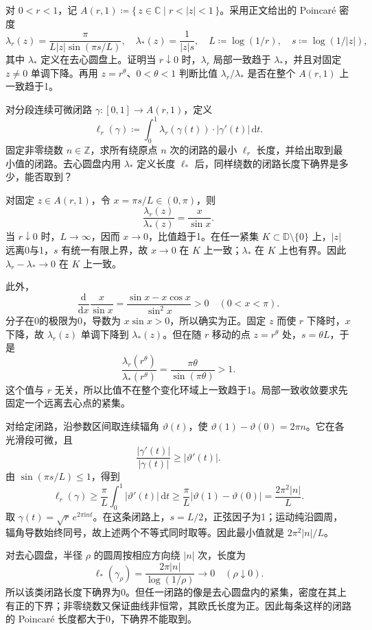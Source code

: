\begin{exercise}[环域退化与闭路长度]\label{b3:ex:12-7}
对 \(0<r<1\)，记 \(A(r,1)\coloneqq\{\,z\in\mathbb C\mid r<|z|<1\,\}\)。采用正文给出的 Poincaré 密度
\[
 \lambda_r(z)=\frac{\pi}{L|z|\sin(\pi s/L)},\quad
 \lambda_*(z)=\frac1{|z|s},\quad
 L\coloneqq\log(1/r),\quad s\coloneqq\log(1/|z|),
\]
其中 \(\lambda_*\) 定义在去心圆盘上。证明当 \(r\downarrow0\) 时，\(\lambda_r\) 局部一致趋于 \(\lambda_*\)，并且对固定 \(z\ne0\) 单调下降。再用 \(z=r^\theta\)、\(0<\theta<1\) 判断比值 \(\lambda_r/\lambda_*\) 是否在整个 \(A(r,1)\) 上一致趋于1。

\ProseParagraphBreak
对分段连续可微闭路 \(\gamma:[0,1]\rightarrow A(r,1)\)，定义
\[
 \ell_r(\gamma)\coloneqq\int_0^1\lambda_r(\gamma(t))\cdot|\gamma'(t)|\,\mathrm dt.
\]
固定非零绕数 \(n\in\mathbb Z\)，求所有绕原点 \(n\) 次的闭路的最小 \(\ell_r\) 长度，并给出取到最小值的闭路。去心圆盘内用 \(\lambda_*\) 定义长度 \(\ell_*\) 后，同样绕数的闭路长度下确界是多少，能否取到？
\end{exercise}
\begin{solution}
对固定 \(z\in A(r,1)\)，令 \(x=\pi s/L\in(0,\pi)\)，则
\[
 \frac{\lambda_r(z)}{\lambda_*(z)}=\frac{x}{\sin x}.
\]
当 \(r\downarrow0\) 时，\(L\rightarrow\infty\)，因而 \(x\rightarrow0\)，比值趋于1。在任一紧集 \(K\subset\mathbb D\setminus\{0\}\) 上，\(|z|\) 远离0与1，\(s\) 有统一有限上界，故 \(x\rightarrow0\) 在 \(K\) 上一致；\(\lambda_*\) 在 \(K\) 上也有界。因此 \(\lambda_r-\lambda_*\rightarrow0\) 在 \(K\) 上一致。

此外，
\[
 \frac{\mathrm d}{\mathrm dx}\frac{x}{\sin x}
 =\frac{\sin x-x\cos x}{\sin^2x}>0\quad(0<x<\pi).
\]
分子在0的极限为0，导数为 \(x\sin x>0\)，所以确实为正。固定 \(z\) 而使 \(r\) 下降时，\(x\) 下降，故 \(\lambda_r(z)\) 单调下降到 \(\lambda_*(z)\)。但在随 \(r\) 移动的点 \(z=r^\theta\) 处，\(s=\theta L\)，于是
\[
 \frac{\lambda_r(r^\theta)}{\lambda_*(r^\theta)}
 =\frac{\pi\theta}{\sin(\pi\theta)}>1.
\]
这个值与 \(r\) 无关，所以比值不在整个变化环域上一致趋于1。局部一致收敛要求先固定一个远离去心点的紧集。

对给定闭路，沿参数区间取连续辐角 \(\vartheta(t)\)，使 \(\vartheta(1)-\vartheta(0)=2\pi n\)。它在各光滑段可微，且
\[
 \frac{|\gamma'(t)|}{|\gamma(t)|}\ge|\vartheta'(t)|.
\]
由 \(\sin(\pi s/L)\le1\)，得到
\[
 \ell_r(\gamma)
 \ge\frac{\pi}{L}\int_0^1|\vartheta'(t)|\,\mathrm dt
 \ge\frac{\pi}{L}|\vartheta(1)-\vartheta(0)|
 =\frac{2\pi^2|n|}{L}.
\]
取 \(\gamma(t)=\sqrt r\,e^{2\pi\mathrm i nt}\)。在这条闭路上，\(s=L/2\)，正弦因子为1；运动纯沿圆周，辐角导数始终同号，故上述两个不等式同时取等。因此最小值就是 \(2\pi^2|n|/L\)。

对去心圆盘，半径 \(\rho\) 的圆周按相应方向绕 \(|n|\) 次，长度为
\[
 \ell_*(\gamma_\rho)=\frac{2\pi|n|}{\log(1/\rho)}\longrightarrow0
 \quad(\rho\downarrow0).
\]
所以该类闭路长度下确界为0。但任一闭路的像是去心圆盘内的紧集，密度在其上有正的下界；非零绕数又保证曲线非恒常，其欧氏长度为正。因此每条这样的闭路的 Poincaré 长度都大于0，下确界不能取到。
\end{solution}

